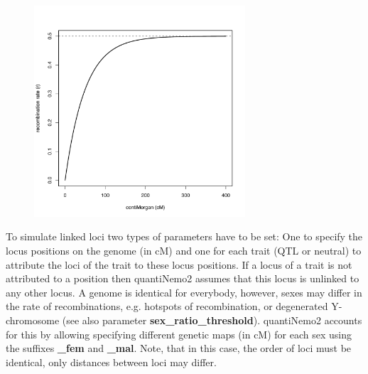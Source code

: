 \documentclass[letterpaper,12pt,oneside]{book}
\begin{document}
\begin{figure}[h]
    \centering
        \includegraphics[width=0.70\textwidth]{cM2r.pdf}
    \label{fig:centiMorgan to recombination rate}
\end{figure}

To simulate linked loci two types of parameters have to be set: One to specify the locus positions on the genome (in cM) and one for each trait (QTL or neutral) to attribute the loci of the trait to these locus positions. If a locus of a trait is not attributed to a position then quantiNemo2 assumes that this locus is unlinked to any other locus. A genome is identical for everybody, however, sexes may differ in the rate of recombinations, e.g. hotspots of recombination, or degenerated Y-chromosome (see also parameter \textbf{sex\_ratio\_threshold}). quantiNemo2 accounts for this by allowing specifying different genetic maps (in cM) for each sex using the suffixes \textbf{\_fem} and \textbf{\_mal}. Note, that in this case, the order of loci must be identical, only distances between loci may differ.
\end{document}
